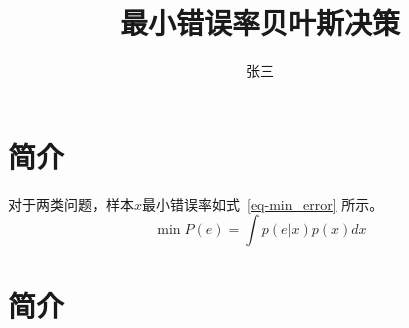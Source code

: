 \documentclass[a4paper]{ctexart}
\title{最小错误率贝叶斯决策}
\author{张三}
\begin{document}
\maketitle
\tableofcontents

\section{简介}
对于两类问题，样本$ x $最小错误率如式~\ref{eq-min_error} 所示。
\begin{equation}\label{eq-min_error}
  \min P(e) = \int {p(e|x)p(x)dx}
\end{equation}

\section{简介}
\end{document}
